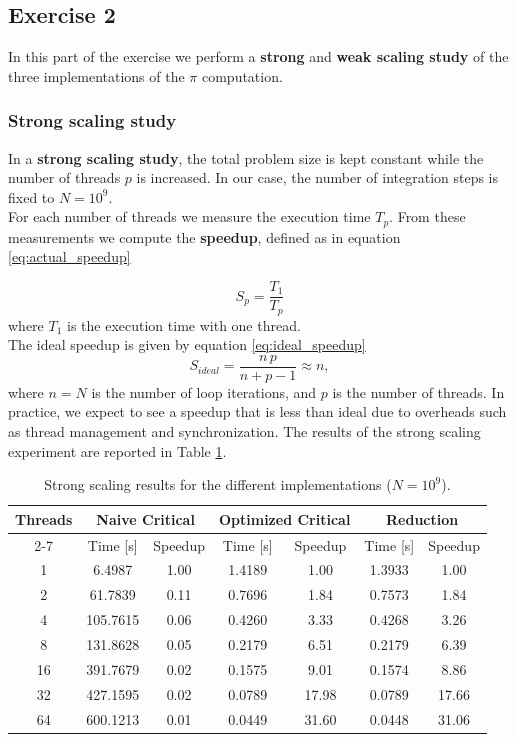 \documentclass[unicode,10pt,a4paper,oneside,numbers=endperiod,openany]{scrartcl}
\begin{document}
\subsection{Exercise 2}

In this part of the exercise we perform a \textbf{strong} and \textbf{weak scaling study} of the three implementations of the $\pi$ computation.

\subsubsection{Strong scaling study}
In a \textbf{strong scaling study}, the total problem size is kept constant while the number of threads $p$ is increased. In our case, the number of integration steps is fixed to $N = 10^9$.\\
For each number of threads we measure the execution time $T_p$. From these measurements we compute the \textbf{speedup}, defined as in equation \ref{eq:actual_speedup}

\begin{equation}
S_p = \frac{T_1}{T_p}
\label{eq:actual_speedup}
\end{equation}
where $T_1$ is the execution time with one thread.\\
The ideal speedup is given by equation \ref{eq:ideal_speedup}
\begin{equation}
S_{ideal} = \frac{n\,p}{n+p-1} \approx n,
\label{eq:ideal_speedup}
\end{equation}
where $n=N$ is the number of loop iterations, and $p$ is the number of threads. In practice, we expect to see a speedup that is less than ideal due to overheads such as thread management and synchronization.
The results of the strong scaling experiment are reported in Table \ref{tab:strong_scaling}.

\begin{table}[!h]
\centering
\caption{Strong scaling results for the different implementations ($N=10^9$).}
\label{tab:strong_scaling}
\begin{tabular}{ccccccc}
\hline
\multirow{2}{*}{Threads} & 
\multicolumn{2}{c}{Naive Critical} &
\multicolumn{2}{c}{Optimized Critical} &
\multicolumn{2}{c}{Reduction} \\
\cline{2-7}
 & Time [s] & Speedup & Time [s] & Speedup & Time [s] & Speedup \\
\hline
1  & 6.4987 & 1.00 & 1.4189 & 1.00 & 1.3933 & 1.00 \\
2  & 61.7839 & 0.11 & 0.7696 & 1.84 & 0.7573 & 1.84 \\
4  & 105.7615 & 0.06 & 0.4260 & 3.33 & 0.4268 & 3.26 \\
8  & 131.8628 & 0.05 & 0.2179 & 6.51 & 0.2179 & 6.39 \\
16 & 391.7679 & 0.02 & 0.1575 & 9.01 & 0.1574 & 8.86 \\
32 & 427.1595 & 0.02 & 0.0789 & 17.98 & 0.0789 & 17.66 \\
64 & 600.1213 & 0.01 & 0.0449 & 31.60 & 0.0448 & 31.06 \\
\hline
\end{tabular}
\end{table}
\end{document}
